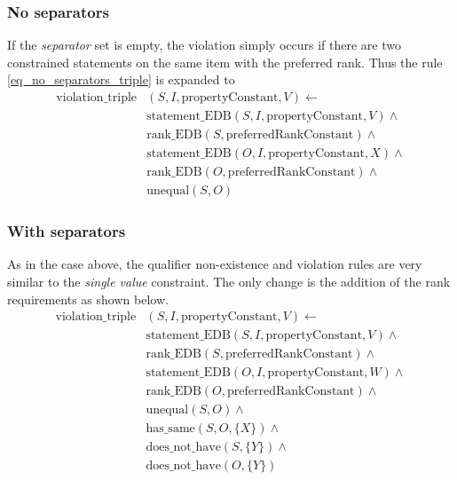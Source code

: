 \documentclass[hyperref,bachelorofscience,fleqn]{cgvpub}
\begin{document}
\subsubsection{No separators}
If the \emph{separator} set is empty, the violation simply occurs if there are two constrained statements on the same item with the preferred rank. Thus the rule \eqref{eq_no_separators_triple} is expanded to
\begin{equation*}
\begin{split}
\text{violation\_triple}&(S, I, \text{propertyConstant}, V) \leftarrow \\
&\text{statement\_EDB}(S, I, \text{propertyConstant}, V) \wedge{} \\
&\text{rank\_EDB}(S, \text{preferredRankConstant}) \wedge{} \\
&\text{statement\_EDB}(O, I, \text{propertyConstant}, X) \wedge{} \\
&\text{rank\_EDB}(O, \text{preferredRankConstant}) \wedge{} \\
&\text{unequal}(S, O)
\end{split}
\end{equation*}

\subsubsection{With separators}
As in the case above, the qualifier non-existence and violation rules are very similar to the \emph{single value} constraint. The only change is the addition of the rank requirements as shown below.
\begin{equation*}
\begin{split}
\text{violation\_triple}&(S, I, \text{propertyConstant}, V) \leftarrow \\
&\text{statement\_EDB}(S, I, \text{propertyConstant}, V) \wedge{} \\
&\text{rank\_EDB}(S, \text{preferredRankConstant}) \wedge{} \\
&\text{statement\_EDB}(O, I, \text{propertyConstant}, W) \wedge{} \\
&\text{rank\_EDB}(O, \text{preferredRankConstant}) \wedge{} \\
&\text{unequal}(S, O) \wedge{} \\
&\text{has\_same}(S, O, \{X\}) \wedge{} \\
&\text{does\_not\_have}(S, \{Y\}) \wedge{} \\
&\text{does\_not\_have}(O, \{Y\})
\end{split}
\end{equation*}
\end{document}
